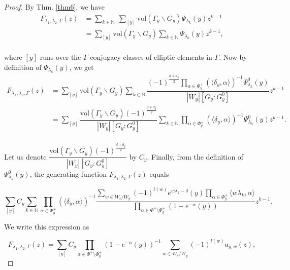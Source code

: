 \documentclass[11 pt]{amsart}
\newcommand{\N}{{\mathbb N}}
\theoremstyle{definition}
\numberwithin{equation}{section}
\begin{document}
\begin{proof}
 By Thm. \ref{thm6}, we have 
\begin{equation}
\begin{split}
 F_{\lambda_1, \lambda_2, \Gamma}(z)
& = \sum\limits_{k \in \N}\ \sum\limits_{[y]} \text{vol} ( \Gamma_y \backslash G_y) \Psi_{\lambda_k}(y) z^{k-1}\\ 
& = \sum\limits_{[y]} \text{vol} (\Gamma_y \backslash G_y) \sum\limits_{k \in \N} \Psi_{\lambda_k} (y) z^{k-1},\\ 
\end{split}
\end{equation}

\noindent where $[y]$ runs over the $\Gamma$-conjugacy classes of elliptic elements in $\Gamma$. Now by definition of $\Psi_{\lambda_k}(y)$, we get 
\begin{equation}
\begin{split}
F_{\lambda_1, \lambda_2, \Gamma}(z)
& = \sum\limits_{[y]} \text{vol} (\Gamma_y \backslash G_y) \sum\limits_{k \in \N} \dfrac{ (-1)^{\tfrac{d + d_y}{2}} \prod\limits_{\alpha \in \Phi_y^+} \left(\langle \delta_y, \alpha \rangle \right) ^{-1} \Psi_{\lambda_k}^0(y)}{|W_y| [G_y : G_y^0]} z^{k-1}\\
& = \sum\limits_{[y]} \dfrac{\text{vol} (\Gamma_y \backslash G_y) (-1)^{\tfrac{d + d_y}{2}}}{|W_y| [G_y : G_y^0]} \sum\limits_{k \in \N} \prod\limits_{\alpha \in \Phi_y^+} \left(\langle \delta_y , \alpha \rangle\right) ^{-1} \Psi_{\lambda_k}^0(y) z^{k-1}.\\
\end{split}
\end{equation}

\noindent Let us denote $\dfrac{\text{vol}(\Gamma_y \backslash G_y) (-1)^{\frac{d+ d_y}{2}}}{|W_y| [ G_y : G_y^0]}$ by $C_y$. Finally, from the definition of $\Psi_{\lambda_k}^0(y)$, the generating function $F_{\lambda_1, \lambda_2, \Gamma}(z)$ equals

$$\sum\limits_{[y]} C_y \sum\limits_{k \in \N} \prod_{\alpha \in \Phi_y^+} (\langle \delta_y , \alpha \rangle) ^{-1} \dfrac{\sum\limits_{w \in W_c / W_y} (-1)^{l(w)} e ^{w \lambda_k -\delta}(y) \prod\limits_{\alpha \in \Phi_y^+} \langle w \lambda_k, \alpha \rangle}{\prod\limits_{\alpha \in \Phi^+ \setminus \Phi_y^+} (1 - e^{-\alpha}(y))}z^{k-1}.$$ 

\noindent We write this expression as 

$$F_{\lambda_1, \lambda_2, \Gamma}(z)= \sum\limits_{[y]} C_y \prod\limits_{\alpha \in \Phi^+ \setminus \Phi_y^+}(1 - e ^{-\alpha}(y))^{-1} \sum\limits_{w \in W_c / W_y} (-1)^{l(w)} a_{y, w}(z),$$


\end{proof}
\end{document}
